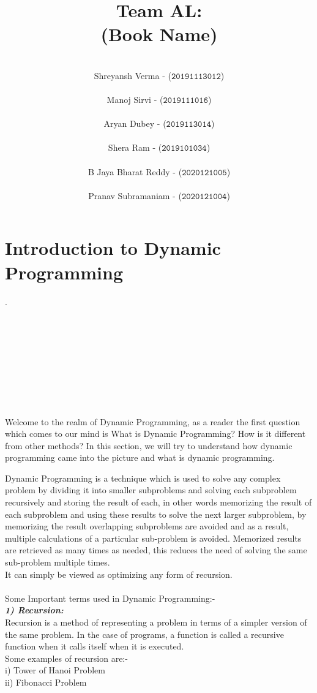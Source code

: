 \documentclass[12pt]{book}
\title{\textbf{{Team AL:\\\LARGE{(Book Name)}}}\\}
\author{\\Shreyansh Verma - ($\mathtt{20191113012}$)\\\\Manoj Sirvi - ($\mathtt{2019111016}$)\\\\Aryan Dubey - ($\mathtt{2019113014}$)\\\\Shera Ram - ($\mathtt{2019101034}$)\\\\B Jaya Bharat Reddy - ($\mathtt{2020121005}$)\\\\Pranav Subramaniam - ($\mathtt{2020121004}$)\\}
\date{}
\begin{document}
\tableofcontents
\part{Introduction to Dynamic Programming}
\newpage
 .\large{  \\ \\ \\ \\ \\ \\ \\ \\ \\ \\
	Welcome to the realm of Dynamic Programming, as a reader the first question which comes to our mind is What is Dynamic Programming? How is it different from other methods?  In this section, we will try to understand how dynamic programming came into the picture and what is dynamic programming.}

		Dynamic Programming is a technique which is used to solve any complex problem by dividing it into smaller subproblems and solving each subproblem recursively and storing the result of each, in other words memorizing the result of each subproblem and using these results to solve the next larger subproblem, by memorizing the result overlapping subproblems are avoided and as a result, multiple calculations of a particular sub-problem is avoided. Memorized results are retrieved as many times as needed, this reduces the need of solving the same sub-problem multiple times.\\
It can simply be viewed as optimizing any form of recursion.\\\\
Some Important terms used in Dynamic Programming:-\\

	\textbf{\textit{1)  Recursion:}}\\ Recursion is a method of representing a problem in terms of a simpler version of the same problem.
In the case of programs, a function is called a recursive function when it calls itself when it is executed.\\

    Some examples of recursion are:-\\
i) Tower of Hanoi Problem\\
ii) Fibonacci Problem\\
\end{document}
